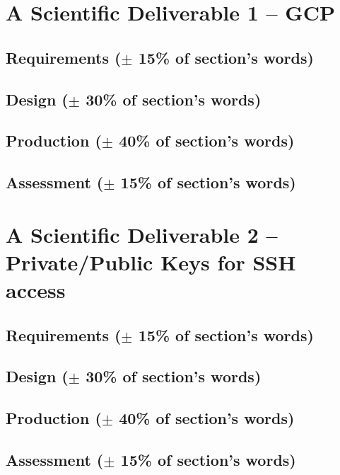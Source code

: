 \section{A Scientific Deliverable 1 -- GCP}
% 
\subsection{Requirements ($\pm$ 15\% of section's words)}

\subsection{Design ($\pm$ 30\% of section's words)}

\subsection{Production ($\pm$ 40\% of section's words)}

\subsection{Assessment ($\pm$ 15\% of section's words)}


\section{A Scientific Deliverable 2 -- Private/Public Keys for SSH
access}
% 
\subsection{Requirements ($\pm$ 15\% of section's words)}

\subsection{Design ($\pm$ 30\% of section's words)}

\subsection{Production ($\pm$ 40\% of section's words)}

\subsection{Assessment ($\pm$ 15\% of section's words)}


